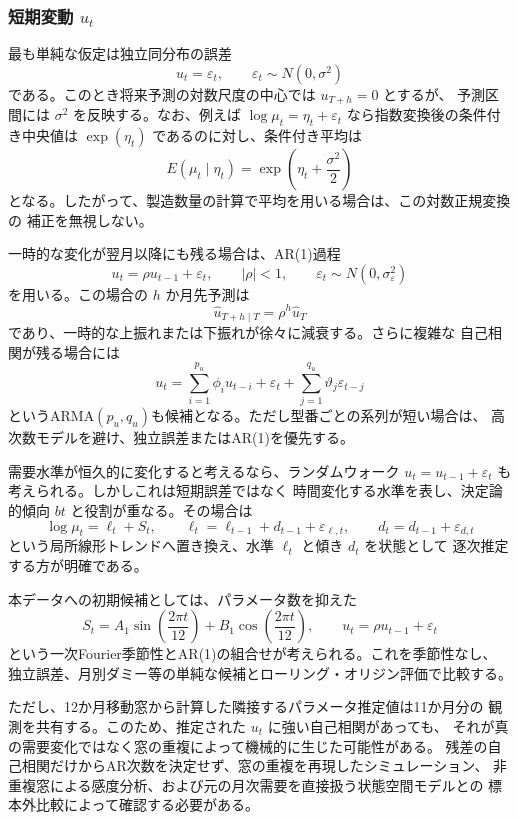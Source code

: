 \documentclass[a4paper,11pt]{jsarticle}
\begin{document}
\subsubsection{短期変動 $u_t$}

最も単純な仮定は独立同分布の誤差
\[
u_t=\varepsilon_t,\qquad
\varepsilon_t\sim N(0,\sigma^2)
\]
である。このとき将来予測の対数尺度の中心では $u_{T+h}=0$ とするが、
予測区間には $\sigma^2$ を反映する。なお、例えば
$\log\mu_t=\eta_t+\varepsilon_t$ なら指数変換後の条件付き中央値は
$\exp(\eta_t)$ であるのに対し、条件付き平均は
\[
E(\mu_t\mid\eta_t)=\exp\left(\eta_t+\frac{\sigma^2}{2}\right)
\]
となる。したがって、製造数量の計算で平均を用いる場合は、この対数正規変換の
補正を無視しない。

一時的な変化が翌月以降にも残る場合は、AR(1)過程
\[
u_t=\rho u_{t-1}+\varepsilon_t,\qquad
|\rho|<1,\qquad \varepsilon_t\sim N(0,\sigma_\varepsilon^2)
\]
を用いる。この場合の $h$ か月先予測は
\[
\hat u_{T+h\mid T}=\rho^h\hat u_T
\]
であり、一時的な上振れまたは下振れが徐々に減衰する。さらに複雑な
自己相関が残る場合には
\[
u_t=\sum_{i=1}^{p_u}\phi_i u_{t-i}+\varepsilon_t
+\sum_{j=1}^{q_u}\vartheta_j\varepsilon_{t-j}
\]
というARMA$(p_u,q_u)$も候補となる。ただし型番ごとの系列が短い場合は、
高次数モデルを避け、独立誤差またはAR(1)を優先する。

需要水準が恒久的に変化すると考えるなら、ランダムウォーク
$u_t=u_{t-1}+\varepsilon_t$ も考えられる。しかしこれは短期誤差ではなく
時間変化する水準を表し、決定論的傾向 $bt$ と役割が重なる。その場合は
\[
\log\mu_t=\ell_t+S_t,\qquad
\ell_t=\ell_{t-1}+d_{t-1}+\varepsilon_{\ell,t},\qquad
d_t=d_{t-1}+\varepsilon_{d,t}
\]
という局所線形トレンドへ置き換え、水準 $\ell_t$ と傾き $d_t$ を状態として
逐次推定する方が明確である。

本データへの初期候補としては、パラメータ数を抑えた
\[
S_t=A_1\sin\left(\frac{2\pi t}{12}\right)
+B_1\cos\left(\frac{2\pi t}{12}\right),\qquad
u_t=\rho u_{t-1}+\varepsilon_t
\]
という一次Fourier季節性とAR(1)の組合せが考えられる。これを季節性なし、
独立誤差、月別ダミー等の単純な候補とローリング・オリジン評価で比較する。

ただし、12か月移動窓から計算した隣接するパラメータ推定値は11か月分の
観測を共有する。このため、推定された $u_t$ に強い自己相関があっても、
それが真の需要変化ではなく窓の重複によって機械的に生じた可能性がある。
残差の自己相関だけからAR次数を決定せず、窓の重複を再現したシミュレーション、
非重複窓による感度分析、および元の月次需要を直接扱う状態空間モデルとの
標本外比較によって確認する必要がある。
\end{document}

